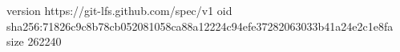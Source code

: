 version https://git-lfs.github.com/spec/v1
oid sha256:71826c9c8b78cb052081058ca88a12224c94efe37282063033b41a24e2c1e8fa
size 262240
